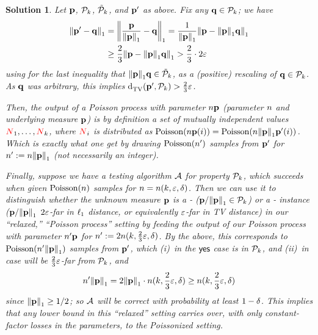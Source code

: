 \documentclass[biber]{nowfnt} %
\newtheorem{solution}{Solution}[chapter]
\newcommand{\occur}{\textcolor{red}{N}}
\newcommand{\occur}{N}
\begin{document}
\begin{solution}
Let $\p$, $\property_\ab$, $\tilde{\property}_\ab$, and $\p'$ as above. Fix any $\q\in \property_\ab$; we have
\begin{align*}
\normone{\p' - \q}
&= \normone{\frac{\p}{\normone{\p}} - \q} 
= \frac{1}{\normone{\p}}\normone{\p - \normone{\p}\q} \\
&\geq \frac{2}{3}\normone{\p - \normone{\p}\q} > \frac{2}{3}\cdot 2\dst
\end{align*}
using for the last inequality that $\normone{\p}\q \in \tilde{\property}_\ab$, as a (positive) rescaling of $\q\in \property_\ab$. As $\q$ was arbitrary, this implies $\totalvardist{\p'}{\property_\ab} > \frac{2}{3}\dst$.

Then, the output of a Poisson process with parameter $\ns\p$ (\ie parameter $\ns$ and underlying measure $\p$) is by definition a set of mutually independent values $\occur_1,\dots, \occur_\ab$, where $\occur_i$ is distributed as $\poisson{\ns\p(i)} = \poisson{\ns\normone{\p}\p'(i)}$. Which is exactly what one get by drawing $\poisson{\ns'}$ \iid samples from $\p'$ for $\ns'\eqdef \ns\normone{\p}$ (not necessarily an integer).

Finally, suppose we have a testing algorithm $\Algo$ for property $\property_\ab$, which succeeds when given $\poisson{\ns}$ samples for $\ns=\ns(\ab, \dst, \errprob)$. Then we can use it to distinguish whether the unknown measure $\p$ is a  \yes- ($\p/\normone{\p}\in \property_\ab$) or a \no- instance ($\p/\normone{\p}$ $2\dst$-far in $\lp[1]$ distance, or equivalently $\dst$-far in TV distance) in our ``relaxed,'' ``Poisson process'' setting by feeding the output of our Poisson process with parameter $\ns'\p$ for $\ns' \eqdef 2\ns(\ab, \frac{2}{3}\dst, \errprob)$. By the above, this corresponds to $\poisson{\ns'\normone{\p}}$ samples from $\p'$, which (i)~in the $\yes$ case is in $\property_\ab$, and (ii)~in \no case will be $\frac{2}{3}\dst$-far from $\property_\ab$, and
\[
	\ns'\normone{\p} = 2\normone{\p} \cdot \ns(\ab, \frac{2}{3}\dst, \errprob) \geq \ns(\ab, \frac{2}{3}\dst, \errprob)
\]
since $\normone{\p} \geq 1/2$; so $\Algo$ will be correct with probability at least $1-\errprob$. This implies that any lower bound in this ``relaxed'' setting carries over, with only constant-factor losses in the parameters, to the Poissonized setting.
\end{solution}
\end{document}
